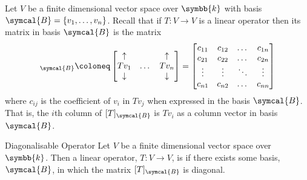 \documentclass[fleqn]{NotesClass}
\renewcommand{\field}{\symbb{k}}
\newcommand{\basis}{\symcal{B}}
\begin{document}
    Let \(V\) be a finite dimensional vector space over \(\field\) with basis \(\basis = \{v_1, \dotsc, v_n\}\).
    Recall that if \(T \colon V \to V\) is a linear operator then its matrix in basis \(\basis\) is the matrix
    \begin{equation}
        [T]_{\basis} \coloneq 
        \begin{bmatrix}
            \uparrow & & \uparrow \\
            Tv_1 & \dots & Tv_n \\
            \downarrow & & \downarrow
        \end{bmatrix}
        =
        \begin{bmatrix}
            c_{11} & c_{12} & \dots & c_{1n}\\
            c_{21} & c_{22} & \dots & c_{2n}\\
            \vdots & \vdots & \ddots & \vdots\\
            c_{n1} & c_{n2} & \dots & c_{nn}
        \end{bmatrix}
    \end{equation}
    where \(c_{ij}\) is the coefficient of \(v_i\) in \(Tv_j\) when expressed in the basis \(\basis\).
    That is, the \(i\)th column of \([T]_{\basis}\) is \(Tv_i\) as a column vector in basis \(\basis\).
    
    \begin{dfn}{Diagonalisable Operator}{}
        Let \(V\) be a finite dimensional vector space over \(\field\).
        Then a linear operator, \(T \colon V \to V\), is  if there exists some basis, \(\basis\), in which the matrix \([T]_{\basis}\) is diagonal.
    \end{dfn}
    
\end{document}
